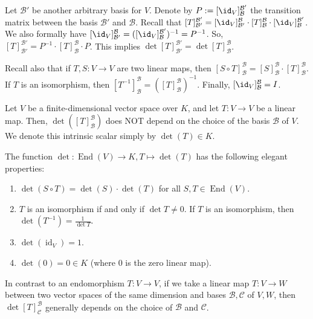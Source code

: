 \begin{answer} Let $\mathcal{B}'$ be another arbitrary basis for $V$. Denote by $P := [\id_V]_{\mathcal{B}}^{\mathcal{B}'}$ the transition matrix between the basis $\mathcal{B}'$ and $\mathcal{B}$. Recall that $[T]_{\mathcal{B}'}^{\mathcal{B}'} = [\id_V]_{\mathcal{B}'}^{\mathcal{B}} \cdot [T]_{\mathcal{B}}^{\mathcal{B}} \cdot [\id_V]_{\mathcal{B}}^{\mathcal{B}'}$.
  We also formally have $[\id_V]_{\mathcal{B}'}^{\mathcal{B}} = ([\id_V]_{\mathcal{B}}^{\mathcal{B}'})^{-1} = P^{-1}$.
  So, $[T]_{\mathcal{B}'}^{\mathcal{B}'} = P^{-1} \cdot [T]_{\mathcal{B}}^{\mathcal{B}} \cdot P$. This implies $\det [T]_{\mathcal{B}'}^{\mathcal{B}'} = \det [T]_{\mathcal{B}}^{\mathcal{B}}$.

  Recall also that if $T, S : V \to V$ are two linear maps, then $[S \circ T]_{\mathcal{B}}^{\mathcal{B}} = [S]_{\mathcal{B}}^{\mathcal{B}} \cdot [T]_{\mathcal{B}}^{\mathcal{B}}$. If $T$ is an isomorphism, then $[T^{-1}]_{\mathcal{B}}^{\mathcal{B}} = ([T]_{\mathcal{B}}^{\mathcal{B}})^{-1}$. Finally, $[\id_V]_{\mathcal{B}}^{\mathcal{B}} = I$.
\end{answer}

\begin{corollary}
  \label{cor:det_endomorphism}
  Let $V$ be a finite-di\-men\-sional vector space over $K$, and let $T : V \to V$ be a linear map. Then, $\det([T]_{\mathcal{B}}^{\mathcal{B}})$ does NOT depend on the choice of the basis $\mathcal{B}$ of $V$. We denote this intrinsic scalar simply by $\det(T) \in K$.
\end{corollary}

The function $\det : \operatorname{End}(V) \to K, T \mapsto \det(T)$ has the following elegant properties:
\begin{enumerate}
  \item $\det(S \circ T) = \det(S) \cdot \det(T)$ for all $S, T \in \operatorname{End}(V)$.
  \item $T$ is an isomorphism if and only if $\det T \neq 0$. If $T$ is an isomorphism, then $\det(T^{-1}) = \frac{1}{\det T}$.
  \item $\det(\operatorname{id}_V) = 1$.
  \item $\det(0) = 0 \in K$ (where $0$ is the zero linear map).
\end{enumerate}

\begin{importantremark}
  In contrast to an endomorphism $T : V \to V$, if we take a linear map $T : V \to W$ between two vector spaces of the same dimension and bases $\mathcal{B}, \mathcal{C}$ of $V, W$, then $\det[T]_{\mathcal{C}}^{\mathcal{B}}$ generally depends on the choice of $\mathcal{B}$ and $\mathcal{C}$.
\end{importantremark}